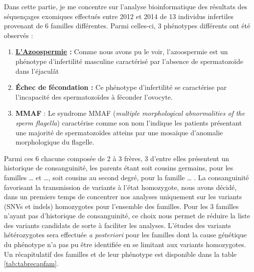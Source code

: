 \documentclass[12pt,twoside]{reedthesis}
\providecommand{\tightlist}{%
  \setlength{\itemsep}{0pt}\setlength{\parskip}{0pt}}
\theoremstyle{definition}
\theoremstyle{definition}
\theoremstyle{remark}
\begin{document}
  Dans cette partie, je me concentre sur l'analyse bioinformatique des
  résultats des séquençages exomiques effectués entre 2012 et 2014 de 13
  individus infertiles provenant de 6 familles différentes. Parmi
  celles-ci, 3 phénotypes différents ont été observés :
  
  \begin{enumerate}
  \def\labelenumi{\arabic{enumi}.}
  \tightlist
  \item
    \textbf{\protect\hyperlink{infquant}{L'Azoospermie} :} Comme nous
    avons pu le voir, l'azoospermie est un phénotype d'infertilité
    masculine caractérisé par l'absence de spermatozoïde dans l'éjaculât\\
  \item
    \textbf{Échec de fécondation :} Ce phénotype d'infertilité se
    caractérise par l'incapacité des spermatozoïdes à féconder
    l'ovocyte.\\
  \item
    \textbf{MMAF} : Le syndrome MMAF (\emph{multiple morphological
    abnormalities of the sperm flagella}) caractérise comme son nom
    l'indique les patients présentant une majorité de spermatozoïdes
    atteins par une mosaïque d'anomalie morphologique du flagelle.
  \end{enumerate}
  
  Parmi ces 6 chacune composée de 2 à 3 frères, 3 d'entre elles présentent
  un historique de consanguinité, les parents étant soit cousins germains,
  pour les familles \ldots{} et \ldots{}, soit cousins au second degré,
  pour la famille \ldots{} . La consanguinité favorisant la transmission
  de variants à l'état homozygote, nous avons décidé, dans un premiers
  temps de concentrer nos analyses uniquement sur les variants (SNVs et
  indels) homozygotes pour l'ensemble des familles. Pour les 3 familles
  n'ayant pas d'historique de consanguinité, ce choix nous permet de
  réduire la liste des variants candidats de sorte à faciliter les
  analyses. L'études des variants hétérozygotes sera effectuée \emph{a
  posteriori} pour les familles dont la cause génétique du phénotype n'a
  pas pu être identifiée en se limitant aux variants homozygotes. Un
  récapitulatif des familles et de leur phénotype est disponible dans la
  table \ref{tab:tabrecapfam}.
  
  \newpage
  
\end{document}
